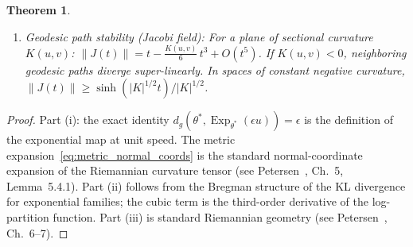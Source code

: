 \documentclass[a4paper,fleqn]{cas-dc}
\newtheorem{theorem}{Theorem}
\DeclareMathOperator{\Exp}{Exp}
\newcommand{\E}{\mathbb{E}}
\begin{document}
\begin{theorem}
\begin{enumerate}
          where $T_{ijk} = \E[\partial_i\ell\, \partial_j\ell\, \partial_k\ell]$
          is the Amari--Chentsov skewness tensor.  The cubic term vanishes
          for Gaussian families parameterized by mean only.
    \item[(iii)] \emph{Geodesic path stability (Jacobi field):}
          For a plane of sectional curvature $K(u,v)$:
          $\|J(t)\| = t - \frac{K(u,v)}{6}\,t^3 + O(t^5)$.
          If $K(u,v)<0$, neighboring geodesic paths diverge
          \emph{super-linearly}.  In spaces of constant negative curvature,
          $\|J(t)\| \geq \sinh(|K|^{1/2}t) / |K|^{1/2}$.
  \end{enumerate}
\end{theorem}

\begin{proof}
  Part (i): the exact identity $d_g(\theta^*,\Exp_{\theta^*}(\epsilon u))=\epsilon$
  is the definition of the exponential map at unit speed.
  The metric expansion~\eqref{eq:metric_normal_coords} is the standard
  normal-coordinate expansion of the Riemannian curvature tensor
  (see Petersen~\cite{petersen2016riemannian}, Ch.~5, Lemma~5.4.1).
  Part (ii) follows from the Bregman structure of the KL divergence
  for exponential families; the cubic term is the third-order
  derivative of the log-partition function.
  Part (iii) is standard Riemannian geometry (see
  Petersen~\cite{petersen2016riemannian}, Ch.~6--7).
\end{proof}
\end{document}
